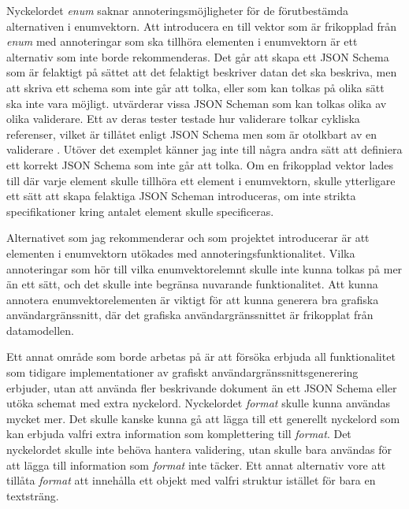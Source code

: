 Nyckelordet \textit{enum} saknar annoteringsmöjligheter för de förutbestämda alternativen i enumvektorn. Att introducera en till vektor som är frikopplad från \textit{enum} med annoteringar som ska tillhöra elementen i enumvektorn är ett alternativ som inte borde rekommenderas. Det går att skapa ett JSON Schema som är felaktigt på sättet att det felaktigt beskriver datan det ska beskriva, men att skriva ett schema som inte går att tolka, eller som kan tolkas på olika sätt ska inte vara möjligt. \citeauthor{Pezoa2016} utvärderar vissa JSON Scheman som kan tolkas olika av olika validerare. Ett av deras tester testade hur validerare tolkar cykliska referenser, vilket är tillåtet enligt JSON Schema men som är otolkbart av en validerare \cite{Pezoa2016}. Utöver det exemplet känner jag inte till några andra sätt att definiera ett korrekt JSON Schema som inte går att tolka. Om en frikopplad vektor lades till där varje element skulle tillhöra ett element i enumvektorn, skulle ytterligare ett sätt att skapa felaktiga JSON Scheman introduceras, om inte strikta specifikationer kring antalet element skulle specificeras.

Alternativet som jag rekommenderar och som projektet introducerar är att elementen i enumvektorn utökades med annoteringsfunktionalitet. Vilka annoteringar som hör till vilka enumvektorelemnt skulle inte kunna tolkas på mer än ett sätt, och det skulle inte begränsa nuvarande funktionalitet. Att kunna annotera enumvektorelementen är viktigt för att kunna generera bra grafiska användargränssnitt, där det grafiska användargränssnittet är frikopplat från datamodellen.

Ett annat område som borde arbetas på är att försöka erbjuda all funktionalitet som tidigare implementationer av grafiskt användargränssnittsgenerering erbjuder, utan att använda fler beskrivande dokument än ett JSON Schema eller utöka schemat med extra nyckelord. Nyckelordet \textit{format} skulle kunna användas mycket mer. Det skulle kanske kunna gå att lägga till ett generellt nyckelord som kan erbjuda valfri extra information som komplettering till \textit{format}. Det nyckelordet skulle inte behöva hantera validering, utan skulle bara användas för att lägga till information som \textit{format} inte täcker. Ett annat alternativ vore att tillåta \textit{format} att innehålla ett objekt med valfri struktur istället för bara en textsträng.


